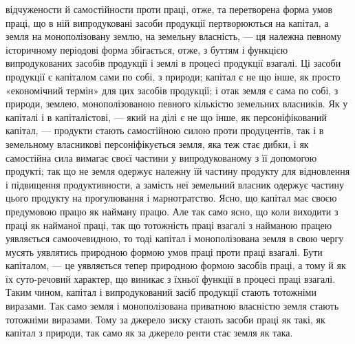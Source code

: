 \parcont{}  %
відчужености й самостійности проти праці, отже, та перетворена форма умов
праці, що в ній випродуковані засоби продукції пертворюються на капітал, а
земля на монополізовану землю, на земельну власність, — ця належна певному
історичному періодові форма збігається, отже, з буттям і функцією випродукованих
засобів продукції і землі в процесі продукції взагалі. Ці засоби продукції
є капіталом сами по собі, з природи; капітал є не що інше, як просто «економічний
термін» для цих засобів продукції; і отак земля є сама по собі, з
природи, землею, монополізованою певного кількістю земельних власників. Як
у капіталі і в капіталістові, — який на ділі є не що інше, як персоніфікований
капітал, — продукти стають самостійною силою проти продуцентів, так і в земельному
власникові персоніфікується земля, яка теж стає дибки, і як самостійна
сила вимагає своєї частини у випродукованому з її допомогою продукті;
так що не земля одержує належну їй частину продукту для відновлення
і підвищення продуктивности, а замість неї земельний власник одержує частину
цього продукту на прогулювання і марнотратство. Ясно, що капітал має
своєю предумовою працю як найману працю. Але так само ясно, що коли виходити
з праці як найманої праці, так що тотожність праці взагалі з найманою
працею уявляється самоочевидною, то тоді капітал і монополізована земля
в свою чергу мусять уявлятись природною формою умов праці проти праці
взагалі. Бути капіталом, — це уявляється тепер природною формою засобів праці,
а тому й як їх суто-речовий характер, що виникає з їхньої функції
в процесі праці взагалі. Таким чином, капітал і випродукований засіб продукції
стають тотожніми виразами. Так само земля і монополізована приватною власністю
земля стають тотожніми виразами. Тому за джерело зиску стають засоби
праці як такі, як капітал з природи, так само як за джерело ренти стає земля
як така.

